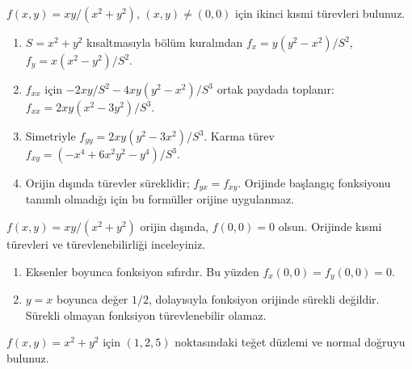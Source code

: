 \begin{tcolorbox}[title={Örnek 5.3 | Dersteki rasyonel fonksiyonun ikinci türevleri},colframe=accent]\(f(x,y)=xy/(x^2+y^2)\), \((x,y)\ne(0,0)\) için ikinci kısmi türevleri bulunuz.
\par{}\end{tcolorbox}
\begin{tcolorbox}[title={Adım adım çözüm},colback=green!3!white,colframe=green]\begin{enumerate}
\item \(S=x^2+y^2\) kısaltmasıyla bölüm kuralından \(f_x=y(y^2-x^2)/S^2\), \(f_y=x(x^2-y^2)/S^2\).
\item \(f_{xx}\) için \(-2xy/S^2-4xy(y^2-x^2)/S^3\) ortak paydada toplanır: \(f_{xx}=2xy(x^2-3y^2)/S^3\).
\item Simetriyle \(f_{yy}=2xy(y^2-3x^2)/S^3\). Karma türev \(f_{xy}=(-x^4+6x^2y^2-y^4)/S^3\).
\item Orijin dışında türevler süreklidir; \(f_{yx}=f_{xy}\). Orijinde başlangıç fonksiyonu tanımlı olmadığı için bu formüller orijine uygulanmaz.
\end{enumerate}\end{tcolorbox}
\begin{tcolorbox}[title={Örnek 5.4 | Kısmi türevler var, süreklilik yok},colframe=accent]\(f(x,y)=xy/(x^2+y^2)\) orijin dışında, \(f(0,0)=0\) olsun. Orijinde kısmi türevleri ve türevlenebilirliği inceleyiniz.
\par\vspace{1mm}{\scriptsize\sffamily Pekiştirme}\end{tcolorbox}
\begin{tcolorbox}[title={Adım adım çözüm},colback=green!3!white,colframe=green]\begin{enumerate}
\item Eksenler boyunca fonksiyon sıfırdır. Bu yüzden \(f_x(0,0)=f_y(0,0)=0\).
\item \(y=x\) boyunca değer \(1/2\), dolayısıyla fonksiyon orijinde sürekli değildir. Sürekli olmayan fonksiyon türevlenebilir olamaz.
\end{enumerate}\end{tcolorbox}
\begin{tcolorbox}[title={Örnek 5.5 | Teğet düzlem ve lineer model},colframe=accent]\(f(x,y)=x^2+y^2\) için \((1,2,5)\) noktasındaki teğet düzlemi ve normal doğruyu bulunuz.
\par\vspace{1mm}{\scriptsize\sffamily Pekiştirme}\end{tcolorbox}
